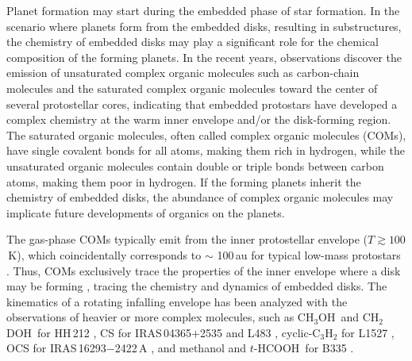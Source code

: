 \documentclass[twocolumn]{aastex62}
\newcommand{\methanol}{\mbox{CH$_{3}$OH}}
\newcommand{\dmethanol}{\mbox{CH$_{2}$DOH}}
\newcommand{\thcooh}{\mbox{$t$-HCOOH}}
\begin{document}
Planet formation may start during the embedded phase of star formation.  In the scenario where planets form from the embedded disks, resulting in substructures, the chemistry of embedded disks may play a significant role for the chemical composition of the forming planets.  In the recent years, observations discover the emission of unsaturated complex organic molecules such as carbon-chain molecules \citep[e.g., ][]{2013ChRv..113.8981S,2014Natur.507...78S,2018ApJ...863...88L} and the saturated complex organic molecules \citep[e.g., ][and the ALMA PILS Survey]{2003ApJ...593L..51C,2007AA...463..601B,2016AA...595A.117J} toward the center of several protostellar cores, indicating that embedded protostars have developed a complex chemistry at the warm inner envelope and/or the disk-forming region.  The saturated organic molecules, often called complex organic molecules (COMs), have single covalent bonds for all atoms, making them rich in hydrogen, while the unsaturated organic molecules contain double or triple bonds between carbon atoms, making them poor in hydrogen.  If the forming planets inherit the chemistry of embedded disks, the abundance of complex organic molecules may implicate future developments of organics on the planets. 

The gas-phase COMs typically emit from the inner protostellar envelope ($T\gtrsim100$\,K), which coincidentally corresponds to $\sim$ 100\,au for typical low-mass protostars \citep{2020ApJ...891...61Y}.  Thus, COMs exclusively trace the properties of the inner envelope where a disk may be forming \citep{2013ChRv..113.8961A,2014Natur.507...78S}, tracing the chemistry and dynamics of embedded disks.  The kinematics of a rotating infalling envelope has been analyzed with the observations of heavier or more complex molecules, such as \methanol\ and \dmethanol\ for HH\,212 \citep{2017ApJ...843...27L}, CS for IRAS\,04365$+$2535 \citep{2016ApJ...820L..34S} and L483 \citep{2017ApJ...837..174O}, cyclic-C$_{3}$H$_{2}$ for L1527 \citep{2014Natur.507...78S}, OCS for IRAS\,16293$-$2422\,A \citep{2016ApJ...824...88O}, and methanol and \thcooh\ for B335 \citep{2019ApJ...873L..21I}.
\end{document}
